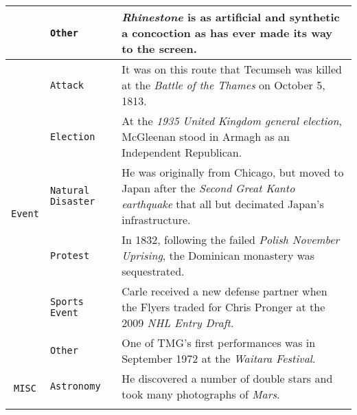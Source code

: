\documentclass[11pt,a4paper, dvipsnames]{article}
\begin{document}
\begin{longtable}{clp{9.5cm}}
                                              & \texttt{\color{Red}Other}               & \textit{\color{Red}Rhinestone} is as artificial and synthetic a concoction as has ever made its way to the screen.                                                 \\ \midrule
\multirow{6}{*}{\texttt{\color{Peach}Event}}                        & \texttt{\color{Peach}Attack}              & It was on this route that Tecumseh was killed at the \textit{\color{Peach}Battle of the Thames} on October 5, 1813.                                                  \\ \cmidrule(r){2-2} \cmidrule(r){3-3}
                                              & \texttt{\color{Peach}Election}            & At the \textit{\color{Peach}1935 United Kingdom general election}, McGleenan stood in Armagh as an Independent Republican.                                           \\ \cmidrule(r){2-2} \cmidrule(r){3-3}
                                              & \texttt{\color{Peach}Natural Disaster}   & He was originally from Chicago, but moved to Japan after the \textit{\color{Peach}Second Great Kanto earthquake} that all but decimated Japan's infrastructure.      \\ \cmidrule(r){2-2} \cmidrule(r){3-3}
                                              & \texttt{\color{Peach}Protest}             & In 1832, following the failed \textit{\color{Peach}Polish November Uprising}, the Dominican monastery was sequestrated.                                              \\ \cmidrule(r){2-2} \cmidrule(r){3-3}
                                              & \texttt{\color{Peach}Sports Event}       & Carle received a new defense partner when the Flyers traded for Chris Pronger at the 2009 \textit{\color{Peach}NHL Entry Draft}.                                     \\ \cmidrule(r){2-2} \cmidrule(r){3-3}
                                              & \texttt{\color{Peach}Other}               & One of TMG's first performances was in September 1972 at the \textit{\color{Peach}Waitara Festival}.                                                                 \\ \midrule
\multirow{12}{*}{\color{Brown}\texttt{MISC}}                       & \texttt{\color{Brown}Astronomy}           & He discovered a number of double stars and took many photographs of \textit{\color{Brown}Mars}.                                                                      \\ \cmidrule(r){2-2} \cmidrule(r){3-3}

\end{longtable}
\end{document}
